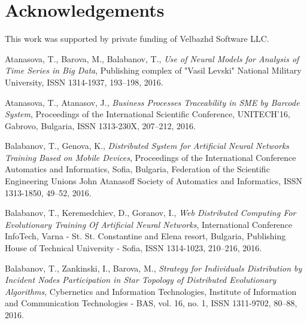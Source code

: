 \documentclass{llncs}
\begin{document}

\section*{Acknowledgements}

This work was supported by private funding of Velbazhd Software LLC.


\begin{thebibliography}{99}

 Atanasova, T., Barova, M., Balabanov, T., \textit{Use of Neural Models for Analysis of Time Series in Big Data}, Publishing complex of "Vasil Levski" National Military University, ISSN 1314-1937, 193--198, 2016.

 Atanasova, T., Atanasov, J., \textit{Business Processes Traceability in SME by Barcode System}, Proceedings of the International Scientific Conference, UNITECH’16, Gabrovo, Bulgaria, ISSN 1313-230X,  207--212, 2016.

 Balabanov, T., Genova, K., \textit{Distributed System for Artificial Neural Networks Training Based on Mobile Devices}, Proceedings of the International Conference Automatics and Informatics, Sofia, Bulgaria, Federation of the Scientific Engineering Unions John Atanasoff Society of Automatics and Informatics, ISSN 1313-1850, 49--52, 2016.

 Balabanov, T., Keremedchiev, D., Goranov, I., \textit{Web Distributed Computing For Evolutionary Training Of Artificial Neural Networks}, International Conference InfoTech, Varna - St. St. Constantine and Elena resort, Bulgaria, Publishing House of Technical University - Sofia, ISSN 1314-1023, 210--216, 2016.

 Balabanov, T., Zankinski, I., Barova, M., \textit{Strategy for Individuals Distribution by Incident Nodes Participation in Star Topology of Distributed Evolutionary Algorithms}, Cybernetics and Information Technologies, Institute of Information and Communication Technologies - BAS, vol. 16, no. 1, ISSN 1311-9702, 80--88, 2016.


\end{thebibliography}
\end{document}
